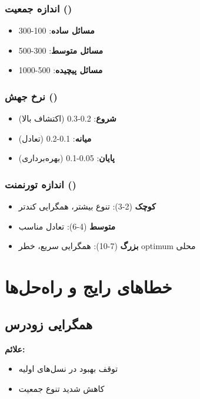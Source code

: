 \documentclass[12pt,a4paper]{article}
\begin{document}
			\subsubsection{اندازه جمعیت ()}
			
			\begin{itemize}
				\item \textbf{مسائل ساده}: 100-300
				\item \textbf{مسائل متوسط}: 300-500
				\item \textbf{مسائل پیچیده}: 500-1000
			\end{itemize}
			
			\subsubsection{نرخ جهش ()}
			
			\begin{itemize}
				\item \textbf{شروع}: 0.2-0.3 (اکتشاف بالا)
				\item \textbf{میانه}: 0.1-0.2 (تعادل)
				\item \textbf{پایان}: 0.05-0.1 (بهره‌برداری)
			\end{itemize}
			
			\subsubsection{اندازه تورنمنت ()}
			
			\begin{itemize}
				\item \textbf{کوچک} (2-3): تنوع بیشتر، همگرایی کندتر
				\item \textbf{متوسط} (4-6): تعادل مناسب
				\item \textbf{بزرگ} (7-10): همگرایی سریع، خطر optimum محلی
			\end{itemize}
			
			\section{خطاهای رایج و راه‌حل‌ها}
			
			\subsection{همگرایی زودرس}
			
			\textbf{علائم:}
			\begin{itemize}
				\item توقف بهبود در نسل‌های اولیه
				\item کاهش شدید تنوع جمعیت
			\end{itemize}
			
\end{document}
